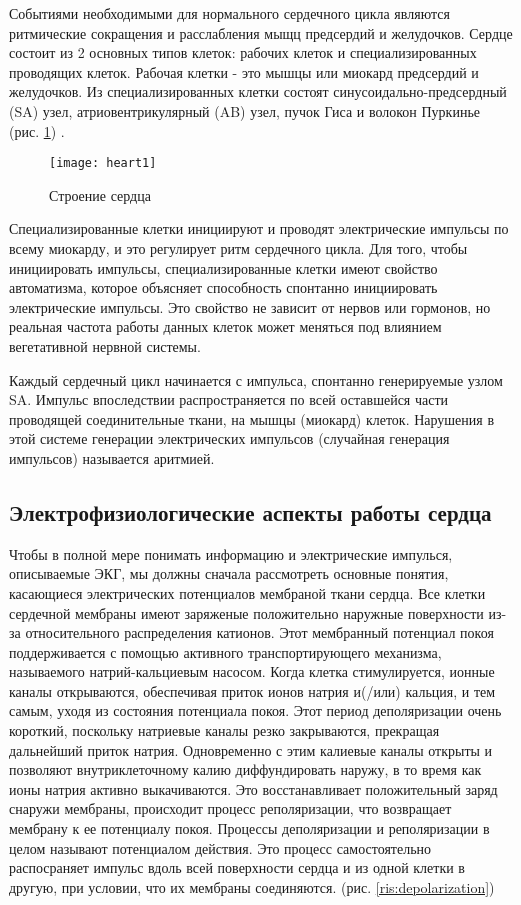 Событиями необходимыми для нормального сердечного цикла являются ритмические сокращения и расслабления мыщц предсердий и желудочков. Сердце состоит из 2 основных типов клеток: рабочих клеток и специализированных проводящих клеток. Рабочая клетки - это мышцы или миокард предсердий и желудочков. Из специализированных клетки  состоят синусоидально-предсердный (SA) узел, атриовентрикулярный (AB) узел, пучок Гиса и волокон Пуркинье (рис. \ref{ris:heart1}) \cite{heart_stracture}.
\begin{figure}[h]
	\begin{center}
		\texttt{[image: heart1]}
		\caption{Строение сердца}
		\label{ris:heart1}
	\end{center}
\end{figure}

Специализированные клетки инициируют и проводят электрические импульсы по всему миокарду, и это регулирует ритм сердечного цикла. Для того, чтобы инициировать импульсы, специализированные клетки имеют свойство автоматизма, которое объясняет способность спонтанно инициировать электрические импульсы. Это свойство не зависит от нервов или гормонов, но реальная частота работы данных клеток может меняться под влиянием вегетативной нервной системы.

Каждый сердечный цикл начинается с импульса, спонтанно генерируемые узлом SA. Импульс впоследствии распространяется по всей оставшейся части проводящей соединительные ткани, на мышцы (миокард) клеток. Нарушения в этой системе генерации электрических импульсов (случайная генерация импульсов) называется аритмией.

\subsection{Электрофизиологические аспекты работы сердца}

Чтобы в полной мере понимать информацию и электрические импулься, описываемые ЭКГ, мы должны сначала рассмотреть основные понятия, касающиеся электрических потенциалов мембраной ткани сердца. Все клетки сердечной мембраны имеют заряженые положительно наружные поверхности из-за относительного распределения катионов. Этот мембранный потенциал покоя поддерживается с помощью активного транспортирующего механизма, называемого натрий-кальциевым насосом. Когда клетка стимулируется, ионные каналы открываются, обеспечивая приток ионов натрия и(/или) кальция, и тем самым, уходя из состояния потенциала покоя. Этот период деполяризации очень короткий, поскольку натриевые каналы резко закрываются, прекращая дальнейший приток натрия. Одновременно с этим калиевые каналы открыты и позволяют внутриклеточному калию диффундировать наружу, в то время как ионы натрия активно выкачиваются. Это восстанавливает положительный заряд снаружи мембраны, происходит процесс реполяризации, что возвращает мембрану к ее потенциалу покоя. Процессы деполяризации и реполяризации в целом называют потенциалом действия. Это процесс самостоятельно распосраняет импульс вдоль всей поверхности сердца и из одной клетки в другую, при условии, что их мембраны соединяются. (рис. \ref{ris:depolarization}) 

